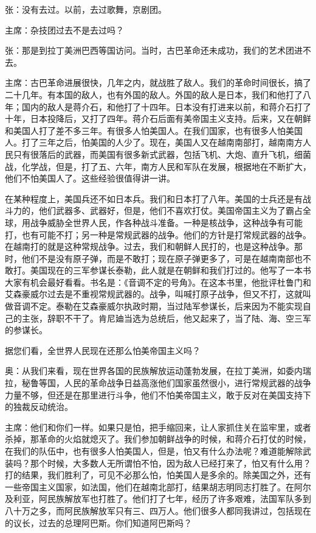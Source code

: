 张：没有去过。以前，去过歌舞，京剧团。

主席：杂技团过去不是去过吗？

张：那是到拉丁美洲巴西等国访问。当时，古巴革命还未成功，我们的艺术团进不去。

主席：古巴革命进展很快，几年之内，就战胜了敌人。我们的革命时间很长，搞了二十几年。有本国的敌人，也有外国的敌人。外国的敌人是日本，我们和他打了八年；国内的敌人是蒋介石，和他打了十四年。日本没有打进来以前，和蒋介石打了十年，日本投降后，又打了四年。蒋介石后面有美帝国主义支持。后来，又在朝鲜和美国人打了差不多三年。有很多人怕美国人。在我们国家，也有很多人怕美国人。打了三年之后，怕美国的人少了。现在，美国人又在越南南部打，越南南方人民只有很落后的武器，而美国有很多新式武器，包括飞机、大炮、直升飞机，细菌战，化学战，但是，打了五、六年，南方人民和军队在发展，根据地在不断扩大，他们不怕美国人了。这些经验很值得讲一讲。

在某种程度上，美国兵还不如日本兵。我们和日本打了八年。美国的士兵还是有战斗力的，他们武器多、武器好，但是，他们不喜欢打仗。美国帝国主义为了霸占全球，用战争威胁全世界人民，作各种战斗准备。一种是核战争，这种战争有可能打，也有可能不打；另一种是常规武器的战争。他们的方针是打常规武器的战争。在越南打的就是这种常规战争。过去，我们和朝鲜人民打的，也是这种战争。那时，他们不是没有原子弹，而是不敢打；现在原子弹更多了，可是在越南南部也不敢打。美国现在的三军参谋长泰勒，此人就是在朝鲜和我们打过的。他写了一本书大家有机会最好看看。书名是：《音调不定的号角》。在这本书里，他批评杜鲁门和艾森豪威尔过去是不重视常规武器的。战争，叫喊打原子战争，但又不打，这就叫做音调不定。泰勒在艾森豪威尔执政时期，当过陆军参谋长，后来因为不能实现自己的主张，辞职不干了。肯尼廸当选为总统后，他又起来了，当了陆、海、空三军的参谋长。

据您们看，全世界人民现在还那么怕美帝国主义吗？

奥：从我们来看，现在世界各国的民族解放运动蓬勃发展，在拉丁美洲，如委内瑞拉，秘鲁等国，人民的革命战争日益高涨他们国家虽然很小，进行常规武器的战争力量不够，但还是在那里进行斗争，他们不怕美帝国主义，敢于反对在美国支持下的独裁反动统治。

主席：他们和你们一样。如果只是怕，把手缩回来，让人家抓住关在监牢里，或者杀掉，那革命的火焰就熄灭了。我们参加朝鲜战争的时候，和蒋介石打仗的时候，在我们的队伍中，也有很多人怕美国人，但是，怕又有什么办法呢？难道能解除武装吗？那个时候，大多数人无所谓怕不怕，因为敌人已经打来了，怕又有什么用？打的结果，我们胜利了，可见不必那么怕，怕美国人是多余的。除美国之外，还有一些帝国主义国家，如法国，他们在越南北部打，结果胡志明同志打胜了。在阿尔及利亚，阿民族解放军也打胜了。他们打了七年，经历了许多艰难，法国军队多到八十万之多，而阿民族解放军只有三、四万人。他们很多人都同我讲过，包括现在的议长，过去的总理阿巴斯。你们知道阿巴斯吗？

